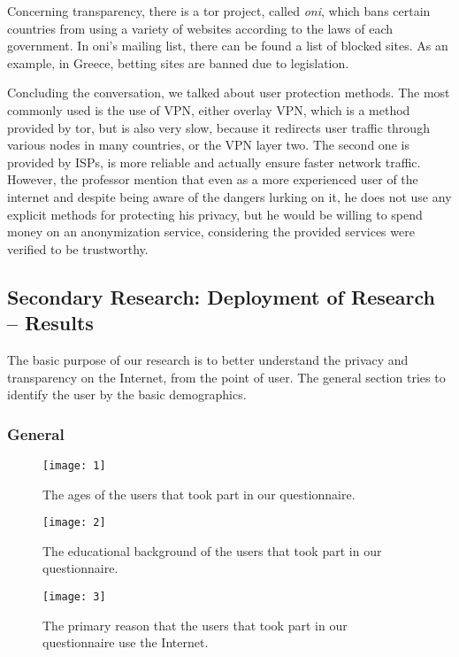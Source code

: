 Concerning transparency, there is a tor project, called \emph{oni}, which bans 
certain countries from using a variety of websites according to the laws of each 
government. In oni's mailing list, there can be found a list of blocked sites. 
As an example, in Greece, betting sites are banned due to legislation.

Concluding the conversation, we talked about user protection methods. The most 
commonly used is the use of VPN, either overlay VPN, which is a method provided 
by tor, but is also very slow, because it redirects user traffic through various 
nodes in many countries, or the VPN layer two. The second one is provided by 
ISPs, is more reliable and actually ensure faster network traffic. However, the 
professor mention that even as a more experienced user of the internet and 
despite being aware of the dangers lurking on it, he does not use any explicit 
methods for protecting his privacy, but he would be willing to spend money on an 
anonymization service, considering the provided services were verified to be 
trustworthy.

\vspace{1cm}
\subsection{Secondary Research: Deployment of Research -- Results}
\vspace{0.7cm}

The basic purpose of our research is to better understand  the privacy and 
transparency on the Internet, from the point of  user.
The general section tries to identify the user by the basic demographics.

\subsubsection{General}

\begin{figure}[H]
\centering
\texttt{[image: 1]}
\caption{The ages of the users that took part in our questionnaire.}
\end{figure}

\begin{figure}[H]
\centering
\texttt{[image: 2]}
\caption{The educational background of the users that took part in our 
questionnaire.}
\end{figure}

\begin{figure}[H]
\centering
\texttt{[image: 3]}
\caption{The primary reason that the users that took part in our questionnaire 
use the Internet.}
\end{figure}

